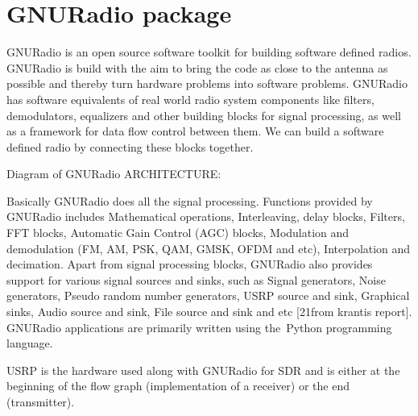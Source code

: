 \section{GNURadio package}

GNURadio is an open source software toolkit for building software defined 
radios. GNURadio is build with the aim to bring the code as close to the
antenna as possible and thereby turn hardware problems into software problems.
GNURadio has software equivalents of real world radio system components like
filters, demodulators, equalizers and other building blocks for signal
processing, as well as a framework for data flow control between them. We can
build a software defined radio by connecting these blocks together. 

Diagram of GNURadio ARCHITECTURE:


Basically GNURadio does all the signal processing. Functions provided by 
GNURadio includes Mathematical operations, Interleaving, delay blocks, 
Filters, FFT blocks, Automatic Gain Control (AGC) blocks, Modulation and 
demodulation (FM, AM, PSK, QAM, GMSK, OFDM and etc), Interpolation and 
decimation. Apart from signal processing blocks, GNURadio also provides 
support for various signal sources and sinks, such as Signal generators, Noise
generators, Pseudo random number generators, USRP source and sink, Graphical 
sinks, Audio source and sink, File source and sink and etc [21from krantis report].
GNURadio applications are primarily written using the Python programming 
language.

USRP is the hardware used along with GNURadio for SDR and is either at the 
beginning of the flow graph (implementation of a receiver) or the end 
(transmitter).





